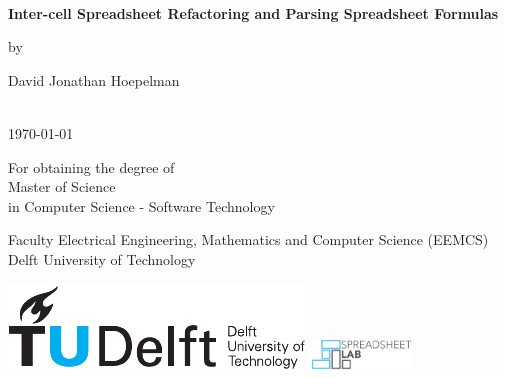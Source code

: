 \thispagestyle{empty}
\onecolumn
{%
\sffamily
\centering

~\vspace{\fill}

{\huge \bfseries
Inter-cell Spreadsheet Refactoring and Parsing Spreadsheet Formulas
}

\vspace{2.0cm}

by

\vspace{2.0cm}

{\LARGE
David Jonathan Hoepelman
}

\vspace{3.0cm}

 \\
\today

\vspace{2.5cm}

For obtaining the degree of \\
Master of Science \\
in Computer Science - Software Technology \\

\vspace{0.5cm}

Faculty Electrical Engineering, Mathematics and Computer Science (EEMCS)\\
Delft University of Technology

\vspace{1.5cm}

\includegraphics{tudelft}
\hspace{0.5cm}
\includegraphics[height=8mm]{spreadsheet-lab}
\hspace{0.5cm}

\vspace{\fill}

}